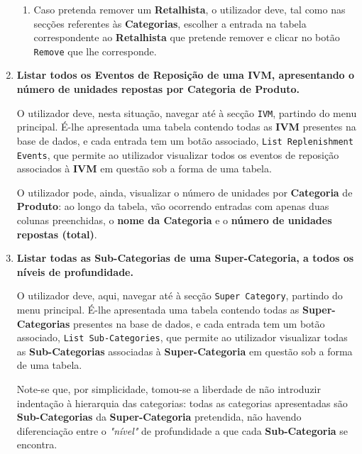 \documentclass[12pt,a4paper]{article}
\begin{document}
\begin{enumerate}
\begin{enumerate}
      \item Caso pretenda remover um \textbf{Retalhista}, o utilizador deve, tal
      como nas secções referentes às \textbf{Categorias}, escolher a entrada na
      tabela correspondente ao \textbf{Retalhista} que pretende remover e clicar
      no botão \texttt{Remove} que lhe corresponde.
    \end{enumerate}
    
    \item \textbf{Listar todos os Eventos de Reposição de uma IVM, apresentando
    o número de unidades repostas por Categoria de Produto.}

    O utilizador deve, nesta situação, navegar até à secção \texttt{IVM},
    partindo do menu principal. É-lhe apresentada uma tabela contendo todas as
    \textbf{IVM} presentes na base de dados, e cada entrada tem um botão
    associado, \texttt{List Replenishment Events}, que permite ao utilizador
    visualizar todos os eventos de reposição associados à \textbf{IVM} em questão
    sob a forma de uma tabela.
    
    O utilizador pode, ainda, visualizar o número
    de unidades por \textbf{Categoria} de \textbf{Produto}: ao longo da tabela,
    vão ocorrendo entradas com apenas duas colunas preenchidas, o \textbf{nome
    da Categoria} e o \textbf{número de unidades repostas (total)}.
    
    \item \textbf{Listar todas as Sub-Categorias de uma Super-Categoria, a todos
    os níveis de profundidade.}

    O utilizador deve, aqui, navegar até à secção \texttt{Super Category},
    partindo do menu principal. É-lhe apresentada uma tabela contendo todas as
    \textbf{Super-Categorias} presentes na base de dados, e cada entrada tem um
    botão associado, \texttt{List Sub-Categories}, que permite ao utilizador
    visualizar todas as \textbf{Sub-Categorias} associadas à \textbf{Super-Categoria}
    em questão sob a forma de uma tabela.
    
    Note-se que, por simplicidade, tomou-se a liberdade de não introduzir indentação
    à hierarquia das categorias: todas as categorias apresentadas são
    \textbf{Sub-Categorias} da \textbf{Super-Categoria} pretendida, não havendo diferenciação
    entre o \textit{"nível"} de profundidade a que cada \textbf{Sub-Categoria} se encontra.

  \end{enumerate}
\end{document}
